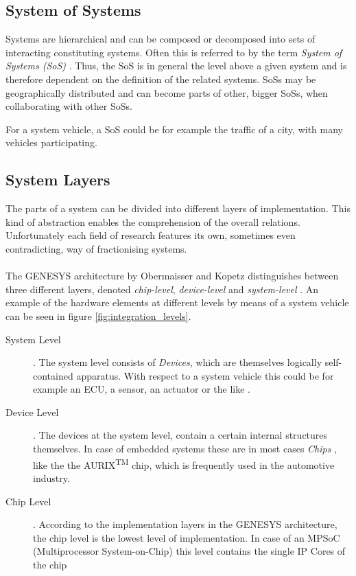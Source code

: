 \subsection{System of Systems}
Systems are hierarchical and can be composed or decomposed into sets of interacting constituting systems. Often this is referred to by the term \emph{System of Systems (SoS)} \cite[p.7]{genesys}. Thus, the SoS is in general the level above a given system and is therefore dependent on the definition of the related systems. SoSs may be geographically distributed and can become parts of other, bigger SoSs, when collaborating with other SoSs.

For a system vehicle, a SoS could be for example the traffic of a city, with many vehicles participating.


\subsection{System Layers}
\label{ch:system_layers}
The parts of a system can be divided into different layers of implementation. This kind of abstraction enables the comprehension of the overall relations. Unfortunately each field of research features its own, sometimes even contradicting, way of fractionising systems.
\\
\\
The GENESYS architecture by Obermaisser and Kopetz distinguishes between three different layers, denoted \emph{chip-level}, \emph{device-level} and \emph{system-level} \cite[p.44]{genesys}. An example of the hardware elements at different levels by means of a system vehicle can be seen in figure \ref{fig:integration_levels}.
\begin{description}
\item [System Level] .
The system level consists of \emph{Devices}, which are themselves logically self-contained apparatus. With respect to a system vehicle this could be for example an ECU, a sensor, an actuator or the like \cite[p.45]{genesys}.
\item [Device Level] .
The devices at the system level, contain a certain internal structures themselves. In case of embedded systems these are in most cases \emph{Chips} \cite[p.45]{genesys}, like the the AURIX\textsuperscript{TM} chip, which is frequently used in the automotive industry.
\item [Chip Level] .
According to the implementation layers in the GENESYS architecture, the chip level is the lowest level of implementation. In case of an MPSoC (Multiprocessor System-on-Chip) this level contains the single IP Cores of the chip \cite[p.46]{genesys}
\end{description}

